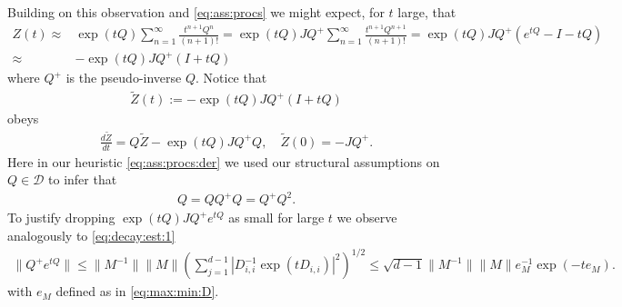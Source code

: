 \documentclass[twoside]{article}
\numberwithin{equation}{section}
\begin{document}
Building on this observation and \eqref{eq:ass:procs} we might expect, for $t$ large, that
\begin{align}
	Z(t) \approx& \exp(t Q)  \sum_{n = 1}^\infty \frac{t^{n+1}Q^n}{(n+1)!}  
	= \exp(t Q) J Q^+  \sum_{n = 1}^\infty \frac{t^{n+1}Q^{n+1}}{(n+1)!}  
	= \exp(t Q) J Q^+  (e^{tQ} - I - t Q)\\
	\approx& -\exp(t Q) J Q^+  ( I + t Q)
	\label{eq:ass:procs:der}
\end{align}
where $Q^+$ is the pseudo-inverse $Q$. 
Notice that
\begin{align}
 \tilde{Z}(t) := -\exp(t Q) J Q^+  ( I + t Q)
 \label{eq:t:ass:diff}
\end{align}
obeys 
\begin{align}
\label{eq:tZ:dym}
	\frac{d \tilde{Z}}{dt} = Q \tilde{Z} -\exp(t Q) J Q^+Q, \quad \tilde{Z}(0) =- J Q^+.
\end{align}
Here in our heuristic \eqref{eq:ass:procs:der} we used our structural assumptions on $Q \in \mathcal{D}$ 
to infer that 
\begin{align*}
Q = Q Q^+ Q = Q^+ Q^2.
\end{align*}
To justify dropping $\exp(t Q) J Q^+ e^{tQ}$
as small for large $t$ we observe analogously to \eqref{eq:decay:est:1}
\begin{align}
	\| Q^+ e^{tQ} \| \leq  \| M^{-1}\| \|M\| \left( \sum_{j =1}^{d-1} | D_{i,i}^{-1} \exp( t D_{i,i}) |^2 \right)^{1/2}
	\leq  \sqrt{d-1}\| M^{-1}\| \|M\| e_M^{-1} \exp(-t e_M).
	\label{eq:decay:est:2}
\end{align}
with $e_M$ defined as in \eqref{eq:max:min:D}.
\end{document}
